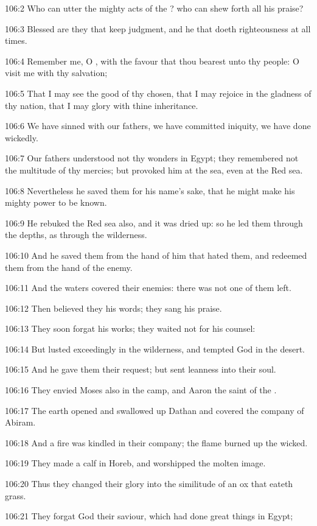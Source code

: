 106:2 Who can utter the mighty acts of the \LORD? who can shew forth all his praise?

106:3 Blessed are they that keep judgment, and he that doeth righteousness at all times.

106:4 Remember me, O \LORD, with the favour that thou bearest unto thy people: O visit me with thy salvation;

106:5 That I may see the good of thy chosen, that I may rejoice in the gladness of thy nation, that I may glory with thine inheritance.

106:6 We have sinned with our fathers, we have committed iniquity, we have done wickedly.

106:7 Our fathers understood not thy wonders in Egypt; they remembered not the multitude of thy mercies; but provoked him at the sea, even at the Red sea.

106:8 Nevertheless he saved them for his name's sake, that he might make his mighty power to be known.

106:9 He rebuked the Red sea also, and it was dried up: so he led them through the depths, as through the wilderness.

106:10 And he saved them from the hand of him that hated them, and redeemed them from the hand of the enemy.

106:11 And the waters covered their enemies: there was not one of them left.

106:12 Then believed they his words; they sang his praise.

106:13 They soon forgat his works; they waited not for his counsel:

106:14 But lusted exceedingly in the wilderness, and tempted God in the desert.

106:15 And he gave them their request; but sent leanness into their soul.

106:16 They envied Moses also in the camp, and Aaron the saint of the \LORD.

106:17 The earth opened and swallowed up Dathan and covered the company of Abiram.

106:18 And a fire was kindled in their company; the flame burned up the wicked.

106:19 They made a calf in Horeb, and worshipped the molten image.

106:20 Thus they changed their glory into the similitude of an ox that eateth grass.

106:21 They forgat God their saviour, which had done great things in Egypt;


